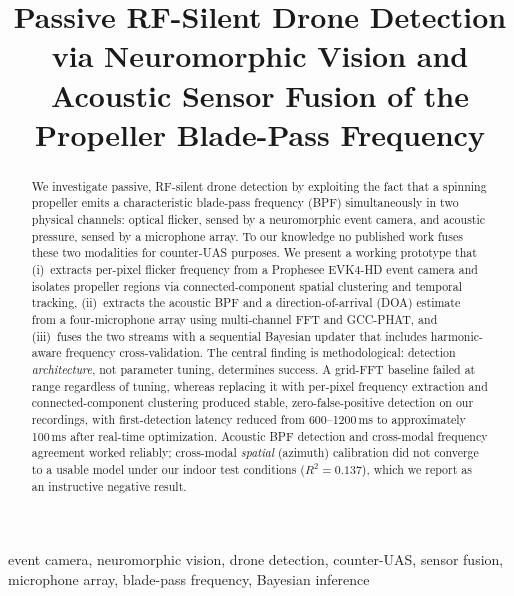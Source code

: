 \documentclass[conference]{IEEEtran}
\begin{document}
\title{Passive RF-Silent Drone Detection via Neuromorphic Vision and
Acoustic Sensor Fusion of the Propeller Blade-Pass Frequency}

\author{
\and
{}
}

\maketitle

\begin{abstract}
We investigate passive, RF-silent drone detection by exploiting the fact
that a spinning propeller emits a characteristic blade-pass frequency
(BPF) simultaneously in two physical channels: optical flicker, sensed by
a neuromorphic event camera, and acoustic pressure, sensed by a microphone
array. To our knowledge no published work fuses these two modalities for
counter-UAS purposes. We present a working prototype that (i)~extracts
per-pixel flicker frequency from a Prophesee EVK4-HD event camera and
isolates propeller regions via connected-component spatial clustering and
temporal tracking, (ii)~extracts the acoustic BPF and a
direction-of-arrival (DOA) estimate from a four-microphone array using
multi-channel FFT and GCC-PHAT, and (iii)~fuses the two streams with a
sequential Bayesian updater that includes harmonic-aware frequency
cross-validation. The central finding is methodological: detection
\emph{architecture}, not parameter tuning, determines success. A grid-FFT
baseline failed at range regardless of tuning, whereas replacing it with
per-pixel frequency extraction and connected-component clustering
produced stable, zero-false-positive detection on our recordings, with
first-detection latency reduced from 600--1200\,ms to approximately
100\,ms after real-time optimization. Acoustic BPF detection and
cross-modal frequency agreement worked reliably; cross-modal
\emph{spatial} (azimuth) calibration did not converge to a usable model
under our indoor test conditions ($R^2 = 0.137$), which we report as an
instructive negative result.
\end{abstract}

\begin{IEEEkeywords}
event camera, neuromorphic vision, drone detection, counter-UAS, sensor
fusion, microphone array, blade-pass frequency, Bayesian inference
\end{IEEEkeywords}
\end{document}
